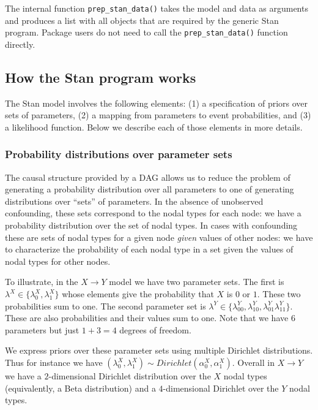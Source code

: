 \documentclass[
  11pt,
  article]{jss}
\begin{document}
The internal function \texttt{prep\_stan\_data()} takes the model and
data as arguments and produces a list with all objects that are required
by the generic Stan program. Package users do not need to call the
\texttt{prep\_stan\_data()} function directly.

\hypertarget{how-the-stan-program-works}{%
\subsection{How the Stan program
works}\label{how-the-stan-program-works}}

The Stan model involves the following elements: (1) a specification of
priors over sets of parameters, (2) a mapping from parameters to event
probabilities, and (3) a likelihood function. Below we describe each of
those elements in more details.

\hypertarget{probability-distributions-over-parameter-sets}{%
\subsubsection{Probability distributions over parameter
sets}\label{probability-distributions-over-parameter-sets}}

The causal structure provided by a DAG allows us to reduce the problem
of generating a probability distribution over all parameters to one of
generating distributions over ``sets'' of parameters. In the absence of
unobserved confounding, these sets correspond to the nodal types for
each node: we have a probability distribution over the set of nodal
types. In cases with confounding these are sets of nodal types for a
given node \emph{given} values of other nodes: we have to characterize
the probability of each nodal type in a set given the values of nodal
types for other nodes.

To illustrate, in the \(X \rightarrow Y\) model we have two parameter
sets. The first is \(\lambda^X \in \{\lambda^X_0, \lambda^X_1\}\) whose
elements give the probability that \(X\) is \(0\) or \(1\). These two
probabilities sum to one. The second parameter set is
\(\lambda^Y \in \{\lambda^Y_{00}, \lambda^Y_{10}, \lambda^Y_{01} \lambda^Y_{11}\}\).
These are also probabilities and their values sum to one. Note that we
have \(6\) parameters but just \(1 + 3 = 4\) degrees of freedom.

We express priors over these parameter sets using multiple Dirichlet
distributions. Thus for instance we have
\((\lambda^X_0, \lambda^X_1) \sim Dirichlet(\alpha^X_0, \alpha^X_1).\)
Overall in \(X \rightarrow Y\) we have a \(2\)-dimensional Dirichlet
distribution over the \(X\) nodal types (equivalently, a Beta
distribution) and a \(4\)-dimensional Dirichlet over the \(Y\) nodal
types.
\end{document}
